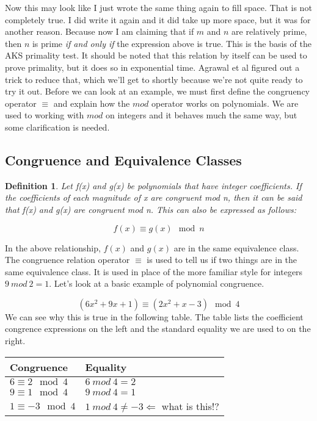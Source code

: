 \documentclass[11pt]{article}
\newtheorem{definition}{Definition}
\begin{document}
Now this may look like I just wrote the same thing again to fill space. That is not completely true. I did write it again and it did take up more space, but it was for another reason. Because now I am claiming that if $m$ and $n$ are relatively prime, then $n$ is prime \emph{if and only if} the expression above is true. This is the basis of the AKS primality test. It should be noted that this relation by itself can be used to prove primality, but it does so in exponential time. Agrawal et al figured out a trick to reduce that, which we'll get to shortly because we're not quite ready to try it out. Before we can look at an example, we must first define the congruency operator $\equiv$ and explain how the $mod$ operator works on polynomials. We are used to working with $mod$ on integers and it behaves much the same way, but some clarification is needed. 

\subsection{Congruence and Equivalence Classes}
\begin{definition}
Let f(x) and g(x) be polynomials that have integer coefficients. If the coefficients of each magnitude of x are congruent mod n, then it can be said that f(x) and g(x) are congruent mod n. This can also be expressed as follows:

$$f(x) \equiv g(x) \mod n$$
 
\end{definition}
In the above relationship, $f(x)$ and $g(x)$ are in the same equivalence class. The congruence relation operator $\equiv$ is used to tell us if two things are in the same equivalence class. It is used in place of the more familiar style for integers $ 9\ mod\ 2 = 1 $. Let's look at a basic example of polynomial congruence.

$$(6x^2+9x+1) \equiv (2x^2+x-3) \mod 4$$ 
We can see why this is true in the following table. The table lists the coefficient congrence expressions on the left and the standard equality we are used to on the right. 

\begin{center}
    \begin{tabular}{ | l | l |}
    \hline
	Congruence & Equality \\ \hline
	$ 6 \equiv 2 \mod 4 $ & $6\ mod\ 4=2$\\ \hline
	$ 9 \equiv 1 \mod 4 $ & $9\ mod\ 4=1$\\ \hline
	$ 1 \equiv -3 \mod 4 $ & $1\ mod\ 4\not=-3\Leftarrow$ what is this!?\\ \hline
    \end{tabular}
\end{center}
\end{document}
